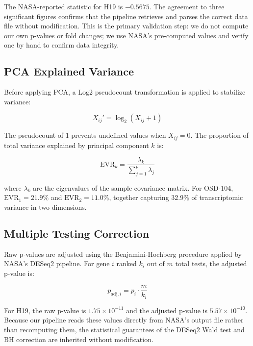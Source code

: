 \documentclass[conference]{IEEEtran}
\begin{document}
The NASA-reported statistic for H19 is $-0.5675$. The agreement to three significant figures confirms that the pipeline retrieves and parses the correct data file without modification. This is the primary validation step: we do not compute our own p-values or fold changes; we use NASA's pre-computed values and verify one by hand to confirm data integrity.

\subsection{PCA Explained Variance}

Before applying PCA, a Log2 pseudocount transformation is applied to stabilize variance:

\begin{equation}
X_{ij}' = \log_2(X_{ij} + 1)
\label{eq:log2transform}
\end{equation}

The pseudocount of 1 prevents undefined values when $X_{ij} = 0$. The proportion of total variance explained by principal component $k$ is:

\begin{equation}
\text{EVR}_k = \frac{\lambda_k}{\displaystyle\sum_{j=1}^{p} \lambda_j}
\label{eq:evr}
\end{equation}

where $\lambda_k$ are the eigenvalues of the sample covariance matrix. For OSD-104, $\text{EVR}_1 = 21.9\%$ and $\text{EVR}_2 = 11.0\%$, together capturing 32.9\% of transcriptomic variance in two dimensions.

\subsection{Multiple Testing Correction}

Raw p-values are adjusted using the Benjamini-Hochberg procedure applied by NASA's DESeq2 pipeline. For gene $i$ ranked $k_i$ out of $m$ total tests, the adjusted p-value is:

\begin{equation}
p_{\text{adj},i} = p_i \cdot \frac{m}{k_i}
\label{eq:bh}
\end{equation}

For H19, the raw p-value is $1.75 \times 10^{-11}$ and the adjusted p-value is $5.57 \times 10^{-10}$. Because our pipeline reads these values directly from NASA's output file rather than recomputing them, the statistical guarantees of the DESeq2 Wald test and BH correction are inherited without modification.
\end{document}
